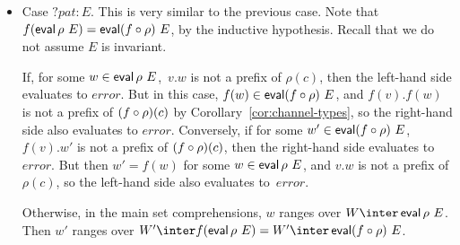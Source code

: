 \begin{itemize}

\item Case $?pat:E$.  This is very similar to the previous case.
  Note that $f(\mathop{\sf eval} \rho~ E) = \mathop{\sf eval}(f\circ\rho)~ E$, by the inductive
  hypothesis.  Recall that we do not assume $E$ is invariant.

  If, for some $w \in\mathop{\sf eval} \rho~ E$,\, $v.w$ is not a prefix of $\rho(c)$,
  then the left-hand side evaluates to $error$.  But in this case,
  $f(w) \in \mathop{\sf eval} (f\circ\rho)~E$, and $f(v).f(w)$ is not a prefix of
  $(f\circ\rho)(c)$ by Corollary~\ref{cor:channel-types}, so the right-hand
  side also evaluates to $error$.  
% 
  Conversely, if for some $w' \in \mathop{\sf eval} (f\circ\rho)~ E$,\, $f(v).w'$ is
  not a prefix of $(f\circ\rho)(c)$, then the right-hand side evaluates to
  $error$.  But then $w' = f(w)$ for some $w \in \mathop{\sf eval} \rho~E$, and $v.w$ is
  not a prefix of $\rho(c)$, so the left-hand side also evaluates to~$error$. 


  Otherwise, in the main set comprehensions, $w$ ranges over $W \inter \eval
  \rho~ E$.  Then $w'$ ranges over $W' \inter f(\eval \rho~ E) = W' \inter
  \eval(f\after\rho)~ E$.
\end{itemize} %


